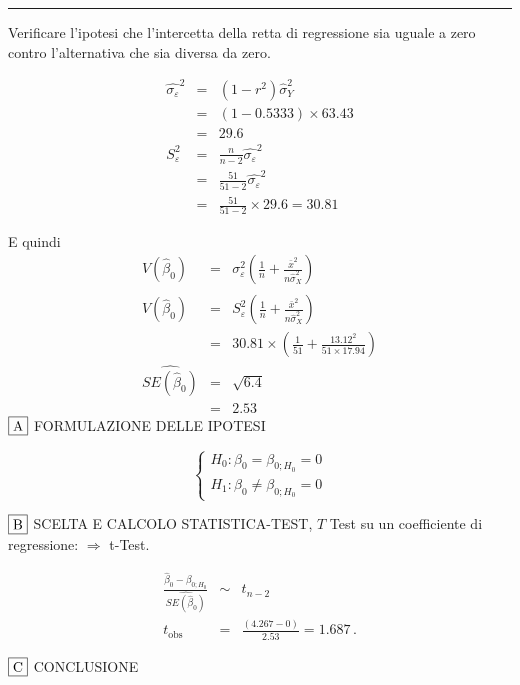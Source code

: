 \documentclass[
  11pt,
]{book}
\theoremstyle{mytheoremstyle}
\theoremstyle{mydefstyle}
\newenvironment{sol}
  {
  \begin{tcolorbox}[enhanced,breakable,arc=0.1mm,boxrule=1pt,colback=white,colframe=iblue,
  title=\bf \fontfamily{lmss}\selectfont \hspace{.5 cm} Soluzione,drop fuzzy shadow]

}{
\end{tcolorbox}
  }
\begin{document}
\begin{center}\rule{0.5\linewidth}{0.5pt}\end{center}

Verificare l'ipotesi che l'intercetta della retta di regressione sia uguale a
zero contro l'alternativa che sia diversa da zero.

\begin{sol}
\begin{eqnarray*}
\hat{\sigma_\varepsilon}^2&=&(1-r^2)\hat\sigma_Y^2\\
&=& (1- 0.5333 )\times 63.43 \\
   &=&  29.6 \\
   S_\varepsilon^2 &=& \frac{n} {n-2} \hat{\sigma_\varepsilon}^2\\
   &=&  \frac{ 51 } { 51 -2} \hat{\sigma_\varepsilon}^2 \\
 &=&  \frac{ 51 } { 51 -2} \times  29.6  =  30.81  
\end{eqnarray*}

E quindi\begin{eqnarray*}
V(\hat\beta_{0}) &=& \sigma_{\varepsilon}^{2} \left( \frac{1} {n}  +  \frac{\bar{x}^{2}} {n \hat{\sigma}^{2}_{X}} \right)\\
\widehat{V(\hat\beta_{0})} &=& S_{\varepsilon}^{2}\left( \frac{1} {n}  +  \frac{\bar{x}^{2}} {n \hat{\sigma}^{2}_{X}} \right)\ \\
 &=&  30.81 \times\left( \frac{1} { 51 }  +  \frac{ 13.12 ^{2}} { 51 \times  17.94 } \right)\\
 \widehat{SE(\hat\beta_{0})}        &=&  \sqrt{ 6.4 }\\
 &=&  2.53 
\end{eqnarray*}
\(\fbox{A}\) FORMULAZIONE DELLE IPOTESI

\[\begin{cases}
   H_0: \beta_0 = \beta_{0;H_0}=0 \\
   H_1: \beta_0 \neq \beta_{0;H_0}=0 
   \end{cases}\]

\(\fbox{B}\) SCELTA E CALCOLO STATISTICA-TEST, \(T\)
Test su un coefficiente di regressione: \(\Rightarrow\) t-Test.

\begin{eqnarray*}
 \frac{\hat\beta_{ 0 } - \beta_{ 0 ;H_0}} {\widehat{SE(\hat\beta_{ 0 })}}&\sim&t_{n-2}\\
   t_{\text{obs}}
&=& \frac{ ( 4.267 -  0 )} { 2.53 }
 =   1.687 \, .
\end{eqnarray*}

\(\fbox{C}\) CONCLUSIONE


\end{sol}
\end{document}
